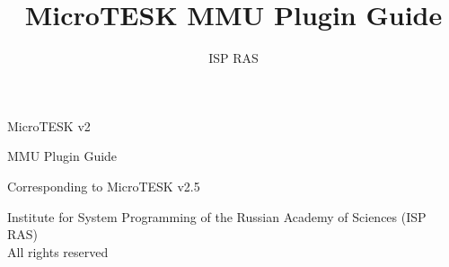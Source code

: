 \documentclass[12pt,letterpaper,extrafontsizes]{memoir}
\title{MicroTESK MMU Plugin Guide}
\author{ISP RAS}
\begin{document}

\frontmatter

\pagestyle{empty}


\vspace*{\fill}
\begin{center}
\HUGE\textsf{MicroTESK v2}\par
\end{center}

\begin{center}
\Huge\textsf{MMU Plugin Guide}\par
\end{center}

\begin{center}
\normalsize\textsf{Corresponding to MicroTESK v2.5}\par
\end{center}

\vspace*{\fill}
\clearpage


\begingroup
\footnotesize
\setlength{\parindent}{0pt}
\setlength{\parskip}{\baselineskip}
\textcopyright{} Institute for System Programming of the Russian Academy of Sciences (ISP RAS)\\
All rights reserved
\endgroup
\clearpage


\pagestyle{headings}

\tableofcontents


\mainmatter



\end{document}
